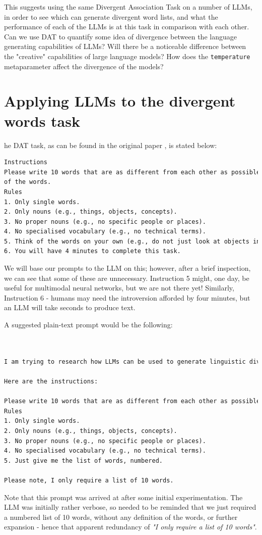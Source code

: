 \documentclass[9pt,a4paper,twoside]{rho-class/rho}
\begin{document}
This suggests using the same Divergent Association Task on a number of LLMs, in order to see which can generate divergent word lists, and what the performance of each of the LLMs is at this task in comparison with each other. Can we use DAT to quantify some idea of divergence between the language generating capabilities of LLMs? Will there be a noticeable difference between the "creative" capabilities of large language models? How does the \texttt{temperature} metaparameter affect the divergence of the models? 

\section{Applying LLMs to the divergent words task}

he DAT task, as can be found in the original paper \cite{naming-unrelated-words}, is stated below:

\nolinenumbers
\begin{lstlisting}[language=TeX, caption=Original task instructions.]
Instructions
Please write 10 words that are as different from each other as possible, in all meanings and uses
of the words.
Rules
1. Only single words.
2. Only nouns (e.g., things, objects, concepts).
3. No proper nouns (e.g., no specific people or places).
4. No specialised vocabulary (e.g., no technical terms).
5. Think of the words on your own (e.g., do not just look at objects in your surroundings).
6. You will have 4 minutes to complete this task.
\end{lstlisting}
\linenumbers
We will base our prompts to the LLM on this; however, after a brief inspection, we can see that some of these are unnecessary. Instruction 5 might, one day, be useful for multimodal neural networks, but we are not there yet! Similarly, Instruction 6 - humans may need the introversion afforded by four minutes, but an LLM will take seconds to produce text.  

A suggested plain-text prompt would be the following:
\nolinenumbers
\label{humanprompt}
\begin{lstlisting}[language=TeX, caption=Original task instructions.]


I am trying to research how LLMs can be used to generate linguistic diversity. To do this, I need you to generate a list of 10 words.

Here are the instructions:

Please write 10 words that are as different from each other as possible, in all meanings and uses of the words.
Rules
1. Only single words.
2. Only nouns (e.g., things, objects, concepts).
3. No proper nouns (e.g., no specific people or places).
4. No specialised vocabulary (e.g., no technical terms).
5. Just give me the list of words, numbered. 

Please note, I only require a list of 10 words.
\end{lstlisting}
\linenumbers
Note that this prompt was arrived at after some initial experimentation. The LLM was initially rather verbose, so needed to be reminded that we just required a numbered list of 10 words, without any definition of the words, or further expansion - hence that apparent redundancy of \emph{"I only require a list of 10 words"}. 
\end{document}
